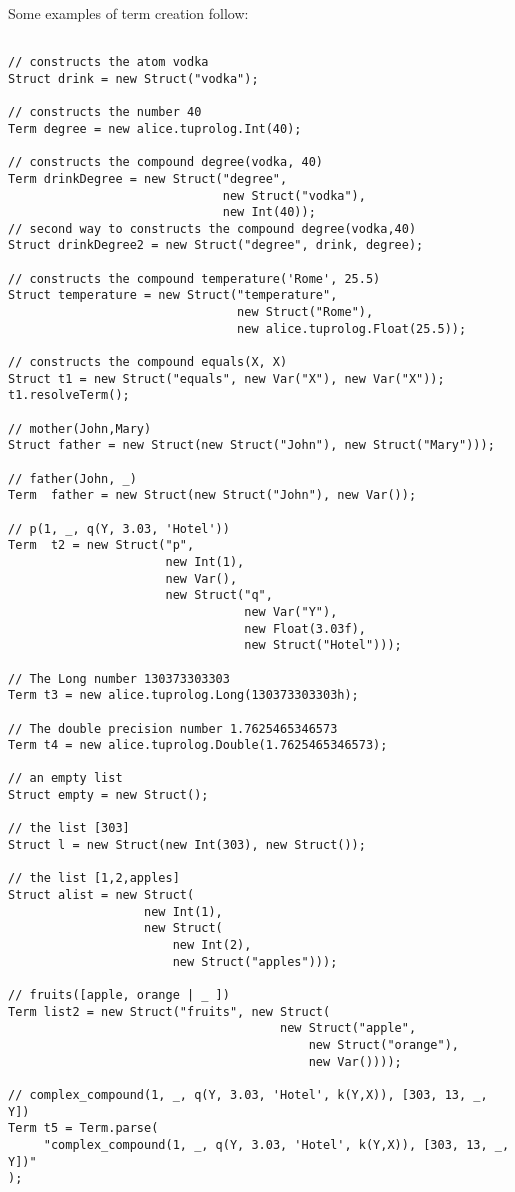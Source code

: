 \noindent Some examples of term creation follow:
%
{\small{\begin{verbatim}

// constructs the atom vodka
Struct drink = new Struct("vodka");

// constructs the number 40
Term degree = new alice.tuprolog.Int(40);

// constructs the compound degree(vodka, 40)
Term drinkDegree = new Struct("degree",
                              new Struct("vodka"),
                              new Int(40));
// second way to constructs the compound degree(vodka,40)
Struct drinkDegree2 = new Struct("degree", drink, degree);

// constructs the compound temperature('Rome', 25.5)
Struct temperature = new Struct("temperature",
                                new Struct("Rome"),
                                new alice.tuprolog.Float(25.5));

// constructs the compound equals(X, X)
Struct t1 = new Struct("equals", new Var("X"), new Var("X"));
t1.resolveTerm();

// mother(John,Mary)
Struct father = new Struct(new Struct("John"), new Struct("Mary")));

// father(John, _)
Term  father = new Struct(new Struct("John"), new Var());

// p(1, _, q(Y, 3.03, 'Hotel'))
Term  t2 = new Struct("p",
                      new Int(1),
                      new Var(),
                      new Struct("q",
                                 new Var("Y"),
                                 new Float(3.03f),
                                 new Struct("Hotel")));

// The Long number 130373303303
Term t3 = new alice.tuprolog.Long(130373303303h);

// The double precision number 1.7625465346573
Term t4 = new alice.tuprolog.Double(1.7625465346573);

// an empty list
Struct empty = new Struct();

// the list [303]
Struct l = new Struct(new Int(303), new Struct());

// the list [1,2,apples]
Struct alist = new Struct(
                   new Int(1),
                   new Struct(
                       new Int(2),
                       new Struct("apples")));

// fruits([apple, orange | _ ])
Term list2 = new Struct("fruits", new Struct(
                                      new Struct("apple",
                                          new Struct("orange"),
                                          new Var())));

// complex_compound(1, _, q(Y, 3.03, 'Hotel', k(Y,X)), [303, 13, _, Y])
Term t5 = Term.parse(
     "complex_compound(1, _, q(Y, 3.03, 'Hotel', k(Y,X)), [303, 13, _, Y])"
);

\end{verbatim}}}
